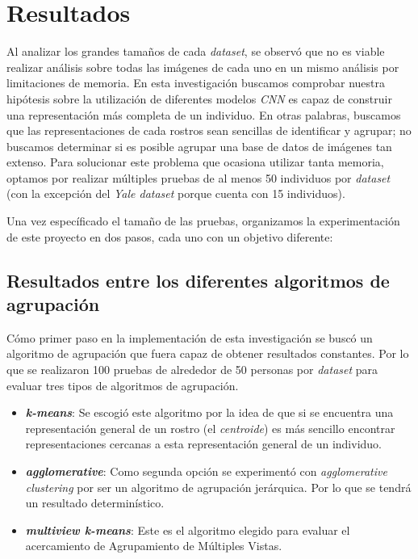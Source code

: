 \documentclass[letterpaper, 10 pt, conference]{ieeeconf}  %
\begin{document}
    \section{Resultados}
    Al analizar los grandes tamaños de cada \textit{dataset}, se observó que no es viable realizar
    análisis sobre todas las imágenes de cada uno en un mismo análisis por limitaciones de memoria.
    En esta investigación buscamos comprobar nuestra hipótesis sobre la utilización de diferentes
    modelos \textit{CNN} es capaz de construir una representación más completa de un individuo.
    En otras palabras, buscamos que las representaciones de cada rostros sean sencillas de
    identificar y agrupar; no buscamos determinar si es posible agrupar una base de datos de
    imágenes tan extenso. Para solucionar este problema que ocasiona utilizar
    tanta memoria, optamos por realizar múltiples pruebas de al menos 50 individuos por
    \textit{dataset} (con la excepción del \textit{Yale dataset} porque cuenta con 15 individuos).

    Una vez específicado el tamaño de las pruebas, organizamos la experimentación de este proyecto
    en dos pasos, cada uno con un objetivo diferente:

    \subsection{Resultados entre los diferentes algoritmos de agrupación}
    Cómo primer paso en la implementación de esta investigación se buscó un algoritmo de agrupación
    que fuera capaz de obtener resultados constantes. Por lo que se realizaron 100 pruebas de
    alrededor de 50 personas por \textit{dataset} para evaluar tres tipos de algoritmos de
    agrupación.

    \begin{itemize}
        \item \textbf{\textit{k-means}}: Se escogió este algoritmo por la idea de que si se
            encuentra una representación general de un rostro (el \textit{centroide}) es más
            sencillo encontrar representaciones cercanas a esta representación general de un
            individuo.
        \item \textbf{\textit{agglomerative}}: Como segunda opción se experimentó con
            \textit{agglomerative clustering} por ser un algoritmo de agrupación jerárquica. Por lo
            que se tendrá un resultado determinístico.
        \item \textbf{\textit{multiview k-means}}: Este es el algoritmo elegido para evaluar el
            acercamiento de Agrupamiento de Múltiples Vistas.
    \end{itemize}
\end{document}

